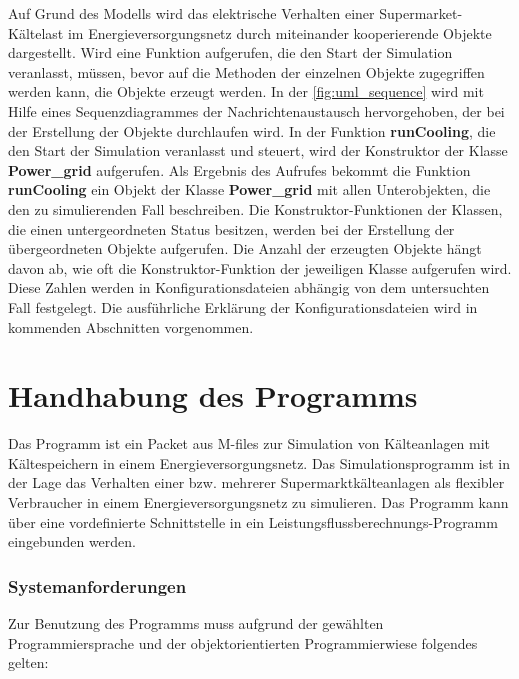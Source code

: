 Auf Grund des Modells wird das elektrische Verhalten einer
Supermarket-K\"altelast im Energieversorgungsnetz durch miteinander
kooperierende Objekte dargestellt. Wird eine Funktion aufgerufen, die den Start
der Simulation veranlasst, m\"ussen, bevor auf die Methoden der einzelnen
Objekte zugegriffen werden kann, die Objekte erzeugt werden. In der
\cref{fig:uml_sequence} wird mit Hilfe eines Sequenzdiagrammes der
Nachrichtenaustausch hervorgehoben, der bei der Erstellung der Objekte
durchlaufen wird. In der Funktion \textbf{runCooling}, die den Start der
Simulation veranlasst und steuert, wird der Konstruktor der Klasse
\textbf{Power\_grid} aufgerufen. Als Ergebnis des Aufrufes bekommt die Funktion
\textbf{runCooling} ein Objekt der Klasse \textbf{Power\_grid} mit allen
Unterobjekten, die den zu simulierenden Fall beschreiben. Die
Konstruktor-Funktionen der Klassen, die einen untergeordneten Status besitzen,
werden bei der Erstellung der \"ubergeordneten Objekte aufgerufen. Die Anzahl
der erzeugten Objekte h\"angt davon ab, wie oft die Konstruktor-Funktion der
jeweiligen Klasse aufgerufen wird. Diese Zahlen werden in Konfigurationsdateien
abh\"angig von dem untersuchten Fall festgelegt. Die ausf\"uhrliche Erkl\"arung
der Konfigurationsdateien wird in kommenden Abschnitten vorgenommen.

\section{Handhabung des Programms}
\label{sc:handhabung}

Das Programm ist ein Packet aus \matlab M-files zur Simulation von Kälteanlagen
mit Kältespeichern in einem Energieversorgungsnetz. Das Simulationsprogramm ist in der
Lage das Verhalten einer bzw. mehrerer Supermarktkälteanlagen als flexibler
Verbraucher in einem Energieversorgungsnetz zu simulieren. Das Programm kann
über eine vordefinierte Schnittstelle in ein Leistungsflussberechnungs-Programm
eingebunden werden.

\subsubsection{Systemanforderungen}

Zur Benutzung des Programms muss aufgrund der gewählten Programmiersprache und
der objektorientierten Programmierwiese folgendes gelten:

